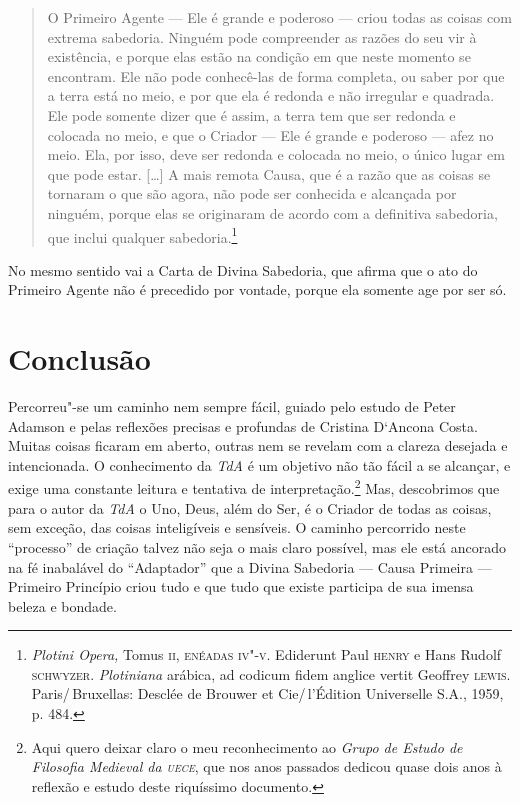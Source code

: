 \begin{quote}
O Primeiro Agente --- Ele é grande e poderoso --- criou todas as
coisas com extrema sabedoria. Ninguém pode compreender as razões
do seu vir à existência, e porque elas estão na condição em que
neste momento se encontram. Ele não pode conhecê-las de forma
completa, ou saber por que a terra está no meio, e por que ela é
redonda e não irregular e quadrada. Ele pode somente dizer que é
assim, a terra tem que ser redonda e colocada no meio, e que o
Criador --- Ele é grande e poderoso --- afez no meio. Ela, por isso,
deve ser redonda e colocada no meio, o único lugar em que pode
estar. [\ldots{}] A mais remota Causa, que é a razão que as coisas se
tornaram o que são agora, não pode ser conhecida e alcançada por
ninguém, porque elas se originaram de acordo com a definitiva
sabedoria, que inclui qualquer sabedoria.\footnote{
\emph{Plotini Opera,} Tomus \textsc{ii}, \textsc{enéadas}
\textsc{iv"-v}. Ediderunt Paul
\textsc{henry} e Hans Rudolf \textsc{schwyzer}. \emph{Plotiniana}
arábica, ad codicum
fidem anglice vertit Geoffrey \textsc{lewis}. Paris/\,Bruxellas: Desclée de
Brouwer et Cie/\,l'Édition Universelle S.A., 1959, p. 484.}  
\end{quote}

No mesmo sentido vai a Carta de Divina Sabedoria, que afirma
que o ato do Primeiro Agente não é precedido por vontade, porque
ela somente age por ser só.

\section{Conclusão} 

Percorreu"-se um caminho nem sempre fácil, guiado pelo estudo de
Peter Adamson e pelas reflexões precisas e profundas de Cristina
D‘Ancona Costa. Muitas coisas ficaram em aberto, outras nem se
revelam com a clareza desejada e intencionada. O conhecimento da
\emph{TdA}  é um objetivo não tão fácil a se alcançar, e exige
uma constante leitura e tentativa de interpretação.\footnote{
Aqui quero deixar claro o meu reconhecimento ao \emph{Grupo de
Estudo de Filosofia Medieval da \textsc{uece}}, que nos anos passados
dedicou quase dois anos à reflexão e estudo deste riquíssimo
documento.} Mas, descobrimos que para o autor da \emph{TdA} o
Uno, Deus, além do Ser, é o Criador de todas as coisas, sem
exceção, das coisas inteligíveis e sensíveis. O caminho
percorrido neste “processo” de criação talvez não seja o mais
claro possível, mas ele está ancorado na fé inabalável do
“Adaptador” que a Divina Sabedoria --- Causa Primeira --- Primeiro
Princípio criou tudo e que tudo que existe participa de sua
imensa beleza e bondade.


